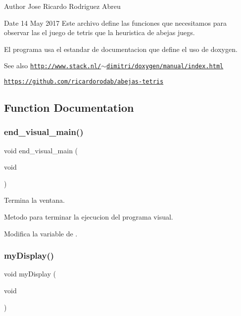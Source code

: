 \begin{DoxyAuthor}{Author}
Jose Ricardo Rodriguez Abreu 
\end{DoxyAuthor}
\begin{DoxyDate}{Date}
14 May 2017 Este archivo define las funciones que necesitamos para observar las el juego de tetris que la heuristica de abejas juegs.
\end{DoxyDate}
El programa usa el estandar de documentacion que define el uso de doxygen.

\begin{DoxySeeAlso}{See also}
\href{http://www.stack.nl/~dimitri/doxygen/manual/index.html}{\tt http\+://www.\+stack.\+nl/$\sim$dimitri/doxygen/manual/index.\+html} 

\href{https://github.com/ricardorodab/abejas-tetris}{\tt https\+://github.\+com/ricardorodab/abejas-\/tetris} 
\end{DoxySeeAlso}


\subsection{Function Documentation}
\mbox{\label{interfaz-grafica_8h_a343542b85d5e7ca60f02b99f0231f526}} 
\subsubsection{\texorpdfstring{end\+\_\+visual\+\_\+main()}{end\_visual\_main()}}
{\footnotesize\ttfamily void end\+\_\+visual\+\_\+main (\begin{DoxyParamCaption}\item[{void}]{ }\end{DoxyParamCaption})}



Termina la ventana. 

Metodo para terminar la ejecucion del programa visual.

Modifica la variable de . \mbox{\label{interfaz-grafica_8h_ac158bfc1571fb83c31d7035c8497a5a3}} 
\subsubsection{\texorpdfstring{my\+Display()}{myDisplay()}}
{\footnotesize\ttfamily void my\+Display (\begin{DoxyParamCaption}\item[{void}]{ }\end{DoxyParamCaption})}



